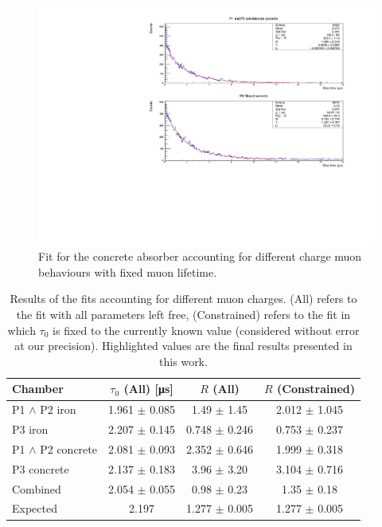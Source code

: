 \documentclass[../main.tex]{subfiles}
\begin{document}
\begin{figure}[htb!]
    \centering
    \includegraphics[width=0.9 \linewidth]{images/fixed_lifetime_fit_concrete.pdf}
    \caption{Fit for the concrete absorber accounting for different charge muon behaviours with fixed muon lifetime.}
    \label{fig:fixedConcrete}
\end{figure}
\FloatBarrier

\begin{table}[htb!]
        \caption{Results of the fits accounting for different muon charges. (All) refers to the fit with all parameters left free, (Constrained) refers to the fit in which $\tau_0$ is fixed to the currently known value (considered without error at our precision). Highlighted values are the final results presented in this work.}
    \label{tab:t0RFit}
        \centering
        \begin{tabular}{|l|cc|c|}
        \hline
        Chamber             & $\tau_0$ (All) [\si{\micro \second}]         & $R$ (All)            & $R$ (Constrained) \\ \hline
        P1 $\land$ P2 iron     & 1.961 $\pm$ 0.085 & 1.49\phantom{0} $\pm$ 1.45\phantom{0}     & 2.012 $\pm$ 1.045     \\
        P3 iron             & 2.207 $\pm$ 0.145 & 0.748 $\pm$ 0.246 & 0.753 $\pm$ 0.237   \\ \hline
        P1 $\land$ P2 concrete & 2.081 $\pm$ 0.093 & 2.352 $\pm$ 0.646   & 1.999 $\pm$ 0.318     \\
        P3 concrete         & 2.137 $\pm$ 0.183 & 3.96\phantom{0} $\pm$ 3.20\phantom{0}     & 3.104 $\pm$ 0.716     \\ \hline
        Combined            & \cellcolor[HTML]{67FD9A}2.054 $\pm$ 0.055 & 0.98\phantom{0}  $\pm$ 0.23\phantom{0}   & \cellcolor[HTML]{67FD9A}1.35\phantom{0}  $\pm$ 0.18\phantom{0}      \\
        Expected \cite{khachatryan2010measurement, Workman2022ynf}           & 2.197 \phantom{$\pm$ 0.000}        & 1.277 $\pm$ 0.005   & 1.277 $\pm$ 0.005     \\ \hline
        \end{tabular}
\end{table}
\end{document}

